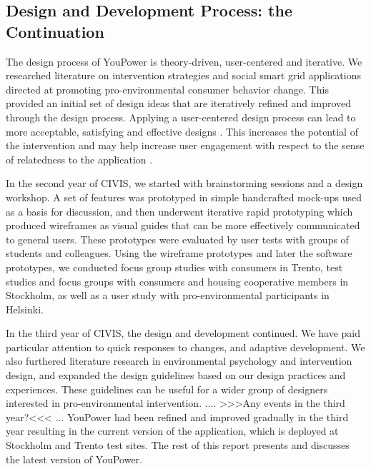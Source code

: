 %
%
%

\subsection{Design and Development Process: the Continuation}

The design process of YouPower is theory-driven, user-centered and iterative. We researched literature on intervention strategies and social smart grid applications directed at promoting pro-environmental consumer behavior change. This provided an initial set of design ideas that are iteratively refined and improved through the design process. Applying a user-centered design process can lead to more acceptable, satisfying and effective designs \citep{Brynjarsdottir2012}. This increases the potential of the intervention \citep{dick2012empowering} and may help increase user engagement with respect to the sense of relatedness to the application \citep{pierce2003state,schwartz2014people,edward2015review}. 

In the second year of CIVIS, we started with brainstorming sessions and a design workshop. A set of features was prototyped in simple handcrafted mock-ups used as a basis for discussion, and then underwent iterative rapid prototyping which produced wireframes as visual guides that can be more effectively communicated to general users. These prototypes were evaluated by user tests with groups of students and colleagues. Using the wireframe prototypes and later the software prototypes, we conducted focus group studies with consumers in Trento, test studies and focus groups with consumers and housing cooperative members in Stockholm, as well as a user study with pro-environmental participants in Helsinki. 

In the third year of CIVIS, the design and development continued. We have paid particular attention to quick responses to changes, and adaptive development. We also furthered literature research in environmental psychology and intervention design, and expanded the design guidelines based on our design practices and experiences. These guidelines can be useful for a wider group of designers interested in pro-environmental intervention.   .... >>>Any events in the third year?<<< ...   YouPower had been refined and improved gradually in the third year resulting in the current version of the application, which is deployed at Stockholm and Trento test sites. The rest of this report presents and discusses the latest version of YouPower. 

 
